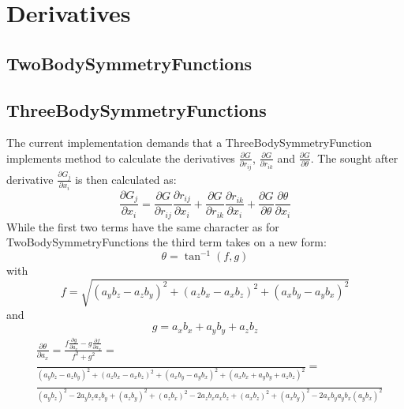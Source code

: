 \documentclass[a4paper,10pt]{article}
\title{}
\author{}
\begin{document}
\section{Derivatives}
\subsection{TwoBodySymmetryFunctions}

\subsection{ThreeBodySymmetryFunctions}
The current implementation demands that a ThreeBodySymmetryFunction implements method to calculate the derivatives $\frac{\partial G}{\partial r_{ij}}$, $\frac{\partial G}{\partial r_{ik}}$ and $\frac{\partial G}{\partial \theta}$. The sought after derivative $\frac{\partial G_j}{\partial x_i}$ is then calculated as:
\begin{equation}
 \frac{\partial G_j}{\partial x_i} = \frac{\partial G}{\partial r_{ij}}\frac{\partial r_{ij}}{\partial x_i} + \frac{\partial G}{\partial r_{ik}}\frac{\partial r_{ik}}{\partial x_i}+\frac{\partial G}{\partial \theta}\frac{\partial \theta}{\partial x_i}
\end{equation}
While the first two terms have the same character as for TwoBodySymmetryFunctions the third term takes on a new form:
\begin{equation}
 \theta = \tan^{-1}(f,g)
\end{equation}
with
\begin{equation}
 f = \sqrt{(a_y b_z - a_z b_y)^2 + (a_z b_x - a_x b_z)^2 + (a_x b_y - a_y b_x)^2}
\end{equation}
and
\begin{equation}
 g = a_x b_x + a_y b_y + a_z b_z
\end{equation}
\begin{equation}
\begin{split}
 &\frac{\partial \theta}{\partial a_x} = \frac{f \frac{\partial g}{\partial a_x} - g \frac{\partial f}{\partial a_x}}{f^2+g^2} = \\
 &\frac{}{(a_y b_z - a_z b_y)^2 + (a_z b_x - a_x b_z)^2 + (a_x b_y - a_y b_x)^2 + (a_x b_x + a_y b_y + a_z b_z)^2} =\\
 &\frac{}{(a_y b_z)^2-2 a_y b_z a_z b_y + (a_z b_y)^2+(a_z b_x)^2-2a_z b_x a_x b_z+(a_x b_z)^2 + (a_x b_y)^2 - 2 a_x b_y a_y b_x (a_y b_x)^2 }
 \end{split} 
\end{equation}
\end{document}
